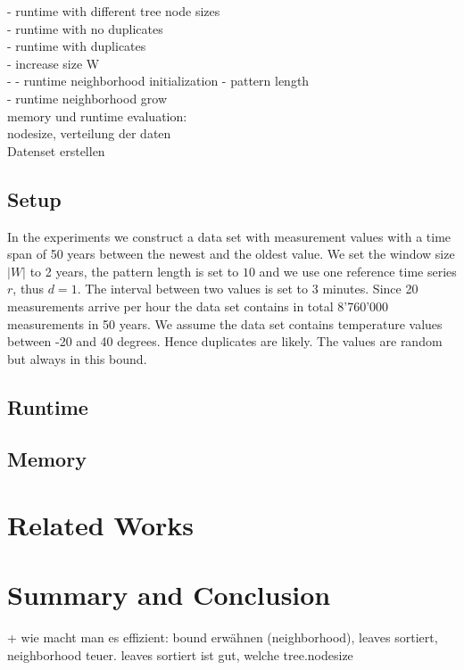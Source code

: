 \documentclass[abstracton,12pt]{scrreprt}
\begin{document}
- runtime with different tree node sizes \\
- runtime with no duplicates\\
- runtime with duplicates\\
- increase size W\\
- 
- runtime neighborhood initialization - pattern length\\
- runtime neighborhood grow\\

memory und runtime evaluation:\\ 
nodesize, verteilung der daten \\
Datenset erstellen \\


\section{Setup}
In the experiments we construct a data set with measurement values with a time span of 50 years between the newest and the oldest value. We set the window size $|W|$ to 2 years, the pattern length is set to $10$ and we use one reference time series $r$, thus $d=1$. The interval between two values is set to $3$ minutes. Since 20 measurements arrive per hour the data set contains in total 8'760'000 measurements in 50 years. We assume the data set contains temperature values between -20 and 40 degrees. Hence duplicates are likely. The values are random but always in this bound. 

\section{Runtime}
\section{Memory}


\chapter{Related Works}


\chapter{Summary and Conclusion}
\label{sec:Summary}

+ wie macht man es effizient: bound erwähnen (neighborhood), leaves sortiert, neighborhood teuer. leaves sortiert ist gut, 
welche tree.nodesize
\end{document}
